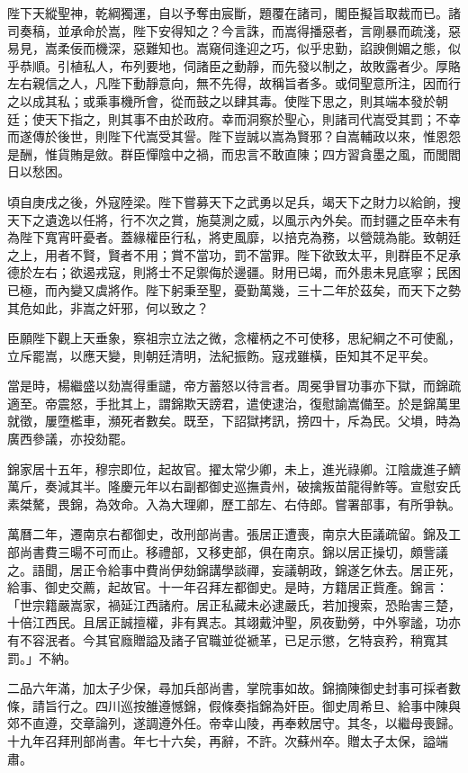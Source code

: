 \begin{pinyinscope}
陛下天縱聖神，乾綱獨運，自以予奪由宸斷，題覆在諸司，閣臣擬旨取裁而已。諸司奏稿，並承命於嵩，陛下安得知之？今言誅，而嵩得播惡者，言剛暴而疏淺，惡易見，嵩柔佞而機深，惡難知也。嵩窺伺逢迎之巧，似乎忠勤，諂諛側媚之態，似乎恭順。引植私人，布列要地，伺諸臣之動靜，而先發以制之，故敗露者少。厚賂左右親信之人，凡陛下動靜意向，無不先得，故稱旨者多。或伺聖意所注，因而行之以成其私；或乘事機所會，從而鼓之以肆其毒。使陛下思之，則其端本發於朝廷；使天下指之，則其事不由於政府。幸而洞察於聖心，則諸司代嵩受其罰；不幸而遂傳於後世，則陛下代嵩受其諐。陛下豈誠以嵩為賢邪？自嵩輔政以來，惟恩怨是酬，惟貨賄是斂。群臣憚陰中之禍，而忠言不敢直陳；四方習貪墨之風，而閭閻日以愁困。

頃自庚戌之後，外寇陸梁。陛下嘗募天下之武勇以足兵，竭天下之財力以給餉，搜天下之遺逸以任將，行不次之賞，施莫測之威，以風示內外矣。而封疆之臣卒未有為陛下寬宵旰憂者。蓋緣權臣行私，將吏風靡，以掊克為務，以營競為能。致朝廷之上，用者不賢，賢者不用；賞不當功，罰不當罪。陛下欲致太平，則群臣不足承德於左右；欲遏戎寇，則將士不足禦侮於邊疆。財用已竭，而外患未見底寧；民困已極，而內變又虞將作。陛下躬秉至聖，憂勤萬幾，三十二年於茲矣，而天下之勢其危如此，非嵩之奸邪，何以致之？

臣願陛下觀上天垂象，察祖宗立法之微，念權柄之不可使移，思紀綱之不可使亂，立斥罷嵩，以應天變，則朝廷清明，法紀振飭。寇戎雖橫，臣知其不足平矣。

當是時，楊繼盛以劾嵩得重譴，帝方蓄怒以待言者。周冕爭冒功事亦下獄，而錦疏適至。帝震怒，手批其上，謂錦欺天謗君，遣使逮治，復慰諭嵩備至。於是錦萬里就徵，屢墮檻車，瀕死者數矣。既至，下詔獄拷訊，搒四十，斥為民。父塤，時為廣西參議，亦投劾罷。

錦家居十五年，穆宗即位，起故官。擢太常少卿，未上，進光祿卿。江陰歲進子鱭萬斤，奏減其半。隆慶元年以右副都御史巡撫貴州，破擒叛苗龍得鮓等。宣慰安氏素桀驁，畏錦，為效命。入為大理卿，歷工部左、右侍郎。嘗署部事，有所爭執。

萬曆二年，遷南京右都御史，改刑部尚書。張居正遭喪，南京大臣議疏留。錦及工部尚書費三暘不可而止。移禮部，又移吏部，俱在南京。錦以居正操切，頗訾議之。語聞，居正令給事中費尚伊劾錦講學談禪，妄議朝政，錦遂乞休去。居正死，給事、御史交薦，起故官。十一年召拜左都御史。是時，方籍居正貲產。錦言：「世宗籍嚴嵩家，禍延江西諸府。居正私藏未必逮嚴氏，若加搜索，恐貽害三楚，十倍江西民。且居正誠擅權，非有異志。其翊戴沖聖，夙夜勤勞，中外寧謐，功亦有不容泯者。今其官廕贈謚及諸子官職並從褫革，已足示懲，乞特哀矜，稍寬其罰。」不納。

二品六年滿，加太子少保，尋加兵部尚書，掌院事如故。錦摘陳御史封事可採者數條，請旨行之。四川巡按雒遵憾錦，假條奏指錦為奸臣。御史周希旦、給事中陳與郊不直遵，交章論列，遂調遵外任。帝幸山陵，再奉敕居守。其冬，以繼母喪歸。十九年召拜刑部尚書。年七十六矣，再辭，不許。次蘇州卒。贈太子太保，謚端肅。


\end{pinyinscope}
